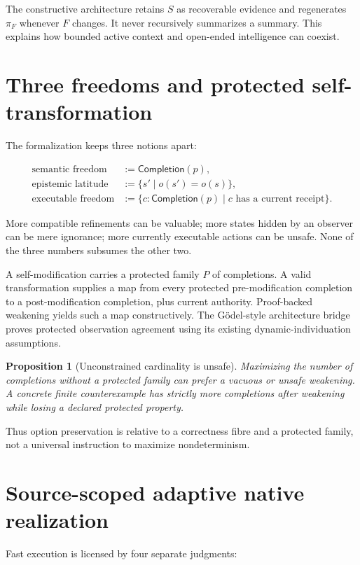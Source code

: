 \documentclass[11pt]{article}
\newtheorem{proposition}[theorem]{Proposition}
\newcommand{\Comp}{\mathsf{Completion}}
\begin{document}
The constructive architecture retains $S$ as recoverable evidence and regenerates
$\pi_F$ whenever $F$ changes.  It never recursively summarizes a summary.  This
explains how bounded active context and open-ended intelligence can coexist.

\section{Three freedoms and protected self-transformation}

The formalization keeps three notions apart:

\begin{align*}
\text{semantic freedom} &:= \Comp(p),\\
\text{epistemic latitude} &:= \{s' \mid o(s')=o(s)\},\\
\text{executable freedom} &:= \{c:\Comp(p) \mid c\text{ has a current receipt}\}.
\end{align*}

More compatible refinements can be valuable; more states hidden by an observer can be
mere ignorance; more currently executable actions can be unsafe.  None of the three
numbers subsumes the other two.

A self-modification carries a protected family $P$ of completions.  A valid
transformation supplies a map from every protected pre-modification completion to a
post-modification completion, plus current authority.  Proof-backed weakening yields
such a map constructively.  The Gödel-style architecture bridge proves protected
observation agreement using its existing dynamic-individuation assumptions.

\begin{proposition}[Unconstrained cardinality is unsafe]
Maximizing the number of completions without a protected family can prefer a vacuous
or unsafe weakening.  A concrete finite counterexample has strictly more completions
after weakening while losing a declared protected property.
\end{proposition}

Thus option preservation is relative to a correctness fibre and a protected family,
not a universal instruction to maximize nondeterminism.

\section{Source-scoped adaptive native realization}

Fast execution is licensed by four separate judgments:
\end{document}
